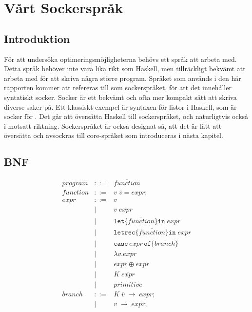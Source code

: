 \documentclass[Rapport]{subfiles}
\begin{document}
\section{Vårt Sockerspråk}

%
%
%
%
%
%
%

%

\subsection{Introduktion}

För att undersöka optimeringsmöjligheterna behövs ett språk att arbeta med. 
Detta språk behöver inte vara lika rikt som Haskell, men tillräckligt bekvämt
att arbeta med för att skriva några större program. Språket som används i den
här rapporten kommer att refereras till som sockerspråket, för att det 
innehåller syntatiskt socker. Socker är ett bekvämt och ofta mer kompakt sätt 
att skriva diverse saker på. Ett klassiskt exempel är syntaxen
för listor i Haskell, \miniCode{[5,0,4]} som är socker för .
    Det går att översätta Haskell till sockerspråket, och naturligtvis också
i motsatt riktning. Sockerspråket är också designat så, att det är lätt att
översätta och avsockras till core-språket som introduceras i nästa kapitel. 

\subsection{BNF}
\begin{equation*}
\begin{aligned}
program &::=& \overline{function} \\
function &::=& v \; \overline{v} \mathtt{=} expr \mathtt{;} \\
expr &::=& v \\
       &|& v \; \overline{expr}  \\
       &|& \mathtt{let \{} \overline{function} \mathtt{\} in }\; expr \\
       &|& \mathtt{letrec \{} \overline{function} \mathtt{\} in} \; expr \\
       &|& \mathtt{case}\,expr\,\mathtt{of \{} \overline{branch} \mathtt{\}} \\
       &|& \mathtt{\lambda } v \mathtt{.} expr \\
       &|& expr \oplus expr \\
       &|& K \; \overline{expr} \\
       &|& primitive \\
branch &::=& K \; \overline{v} \; \mathtt{\rightarrow} \; expr \mathtt{;} \\
         &|& v \; \mathtt{\rightarrow} \; expr \mathtt{;}
\end{aligned}
\end{equation*}
\end{document}

